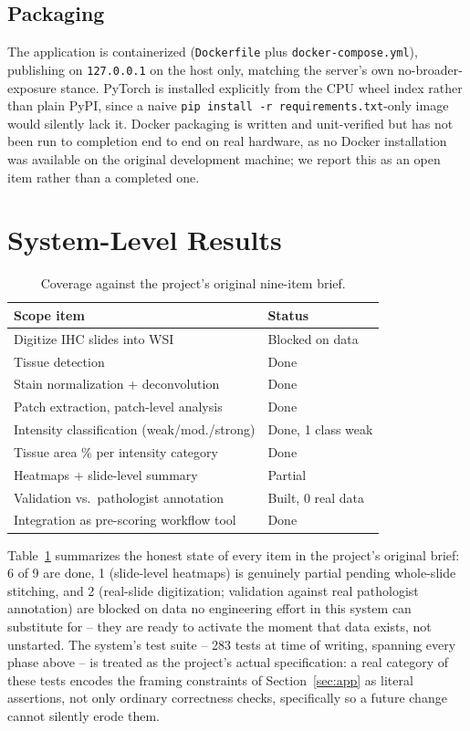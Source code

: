 \documentclass[conference]{IEEEtran}
\begin{document}
\subsection{Packaging}

The application is containerized (\texttt{Dockerfile} plus
\texttt{docker-compose.yml}), publishing on \texttt{127.0.0.1} on the host
only, matching the server's own no-broader-exposure stance. PyTorch is
installed explicitly from the CPU wheel index rather than plain PyPI, since
a naive \texttt{pip install -r requirements.txt}-only image would silently
lack it. Docker packaging is written and unit-verified but has not been
run to completion end to end on real hardware, as no Docker installation
was available on the original development machine; we report this as an
open item rather than a completed one.

\section{System-Level Results}

\begin{table}[t]
\centering
\caption{Coverage against the project's original nine-item brief.}
\label{tab:coverage}
\small
\begin{tabular}{p{}l}
\toprule
Scope item & Status \\
\midrule
Digitize IHC slides into WSI & Blocked on data \\
Tissue detection & Done \\
Stain normalization + deconvolution & Done \\
Patch extraction, patch-level analysis & Done \\
Intensity classification (weak/mod./strong) & Done, 1 class weak \\
Tissue area \% per intensity category & Done \\
Heatmaps + slide-level summary & Partial \\
Validation vs.\ pathologist annotation & Built, 0 real data \\
Integration as pre-scoring workflow tool & Done \\
\bottomrule
\end{tabular}
\end{table}

Table~\ref{tab:coverage} summarizes the honest state of every item in the
project's original brief: 6 of 9 are done, 1 (slide-level heatmaps) is
genuinely partial pending whole-slide stitching, and 2 (real-slide
digitization; validation against real pathologist annotation) are blocked
on data no engineering effort in this system can substitute for -- they
are ready to activate the moment that data exists, not unstarted. The
system's test suite -- 283 tests at time of writing, spanning every phase
above -- is treated as the project's actual specification: a real category
of these tests encodes the framing constraints of
Section~\ref{sec:app} as literal assertions, not only ordinary
correctness checks, specifically so a future change cannot silently erode
them.
\end{document}
